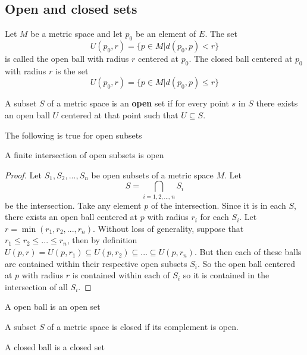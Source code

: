 \documentclass{article}
\begin{document}
\subsection{Open and closed sets}
\begin{definition}
    Let $M$ be a metric space and let $p_0$ be an element of $E$. The set
    \[
    U(p_0,r) = \{p\in M| d(p_0, p) < r\}
    \]
    is called the open ball with radius $r$ centered at $p_0$. The closed ball centered at $p_0$ 
    with radius $r$ is the set
    \[
    U(p_0,r) = \{p\in M| d(p_0, p) \leq r\}
    \]

\end{definition}

\begin{definition}
    A subset $S$ of a metric space is an \textbf{open} set if for every point $s$ in $S$ there exists an open ball $U$ centered at that point such that 
    $U\subseteq S$.
\end{definition}
The following is true for open subsets
\begin{theorem}
    A finite intersection of open subsets is open
\end{theorem}
\begin{proof}
    Let $S_1,S_2,...,S_n$ be open subsets of a metric space $M$. Let \[ S=\bigcap_{i=1,2,...,n}S_i\] be the intersection. Take any element $p$ of the intersection. 
    Since it is in each $S$, there exists an open ball centered at $p$ with radius $r_i$ for each $S_i$. Let $r=\min{(r_1,r_2,...,r_n)}$. Without loss of generality, suppose that
    $r_1 \leq r_2\leq...\leq r_n$, then by definition $U(p,r) =U(p,r_1) \subseteq U(p, r_2) \subseteq ... \subseteq U(p, r_n)$. But then each of these balls are contained within their respective open
    subsets $S_i$. So the open ball centered at $p$ with radius $r$ is contained within each of $S_i$ so it is contained in the intersection of all $S_i$.
\end{proof}
\begin{theorem}
    A open ball is an open set
\end{theorem}
\begin{definition}
    A subset $S$ of a metric space is closed if its complement is open.
\end{definition}
\begin{theorem}
    A closed ball is a closed set
\end{theorem}







\end{document}
